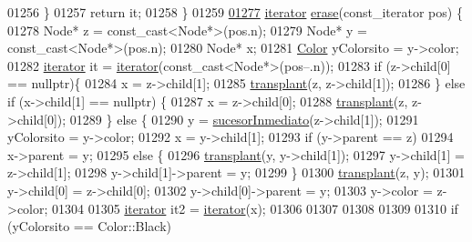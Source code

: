 \begin{DoxyCode}
01256         \}
01257         \textcolor{keywordflow}{return} it;
01258     \}
01259 
\hyperlink{classaed2_1_1map_ad8e796bf9c9c558e5ce6b61e116253fe_ad8e796bf9c9c558e5ce6b61e116253fe}{01277}     \hyperlink{classaed2_1_1iterator}{iterator} \hyperlink{classaed2_1_1map_ad8e796bf9c9c558e5ce6b61e116253fe_ad8e796bf9c9c558e5ce6b61e116253fe}{erase}(const\_iterator pos) \{
01278         Node* z = \textcolor{keyword}{const\_cast<}Node*\textcolor{keyword}{>}(pos.n);
01279         Node* y = \textcolor{keyword}{const\_cast<}Node*\textcolor{keyword}{>}(pos.n);
01280         Node* x;
01281         \hyperlink{classaed2_1_1map_a6d62a415a4b9d320b30cada4ebcf9f5b_a6d62a415a4b9d320b30cada4ebcf9f5b}{Color} yColorsito = y->color;
01282         \hyperlink{classaed2_1_1iterator}{iterator} it = \hyperlink{classaed2_1_1iterator}{iterator}(const\_cast<Node*>(pos--.n));
01283         \textcolor{keywordflow}{if} (z->child[0] == \textcolor{keyword}{nullptr})\{
01284             x = z->child[1];
01285             \hyperlink{classaed2_1_1map_a98b9f200c64ce02dfb67902ee00e375a_a98b9f200c64ce02dfb67902ee00e375a}{transplant}(z, z->child[1]);
01286         \} \textcolor{keywordflow}{else} \textcolor{keywordflow}{if} (x->child[1] == \textcolor{keyword}{nullptr}) \{
01287             x = z->child[0];
01288             \hyperlink{classaed2_1_1map_a98b9f200c64ce02dfb67902ee00e375a_a98b9f200c64ce02dfb67902ee00e375a}{transplant}(z, z->child[0]);
01289         \} \textcolor{keywordflow}{else} \{
01290             y = \hyperlink{classaed2_1_1map_a51169c7d557dc5cf26eac59e6e5e6d98_a51169c7d557dc5cf26eac59e6e5e6d98}{sucesorInmediato}(z->child[1]);
01291             yColorsito = y->color;
01292             x = y->child[1];
01293             \textcolor{keywordflow}{if} (y->parent == z)
01294                 x->parent = y;
01295             \textcolor{keywordflow}{else} \{
01296                 \hyperlink{classaed2_1_1map_a98b9f200c64ce02dfb67902ee00e375a_a98b9f200c64ce02dfb67902ee00e375a}{transplant}(y, y->child[1]);
01297                 y->child[1] = z->child[1];
01298                 y->child[1]->parent = y;
01299             \}
01300             \hyperlink{classaed2_1_1map_a98b9f200c64ce02dfb67902ee00e375a_a98b9f200c64ce02dfb67902ee00e375a}{transplant}(z, y);
01301             y->child[0] = z->child[0];
01302             y->child[0]->parent = y;
01303             y->color = z->color;
01304 
01305             \hyperlink{classaed2_1_1iterator}{iterator} it2 = \hyperlink{classaed2_1_1iterator}{iterator}(x);
01306 
01307 
01308 
01309 
01310             \textcolor{keywordflow}{if} (yColorsito == Color::Black)

\end{DoxyCode}
